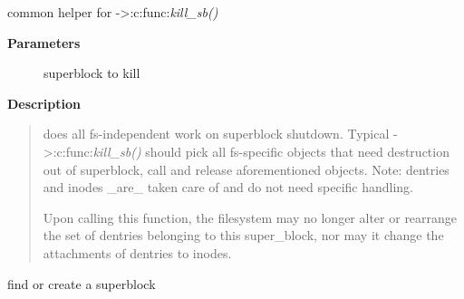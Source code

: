\documentclass[a4paper,8pt,english]{sphinxmanual}
\begin{document}
\begin{fulllineitems}
\label{filesystems/index:c.generic_shutdown_super}
common helper for -\textgreater{}:c:func:\emph{kill\_sb()}

\end{fulllineitems}


\textbf{Parameters}
\begin{description}
\item[{}] \leavevmode
superblock to kill

\end{description}

\textbf{Description}
\begin{quote}

{\hyperref[filesystems/index:c.generic_shutdown_super]{\emph{}}} does all fs-independent work on superblock
shutdown.  Typical -\textgreater{}:c:func:\emph{kill\_sb()} should pick all fs-specific objects
that need destruction out of superblock, call {\hyperref[filesystems/index:c.generic_shutdown_super]{\emph{}}}
and release aforementioned objects.  Note: dentries and inodes \_are\_
taken care of and do not need specific handling.

Upon calling this function, the filesystem may no longer alter or
rearrange the set of dentries belonging to this super\_block, nor may it
change the attachments of dentries to inodes.
\end{quote}

\begin{fulllineitems}
\label{filesystems/index:c.sget_userns}
find or create a superblock

\end{fulllineitems}
\end{document}
